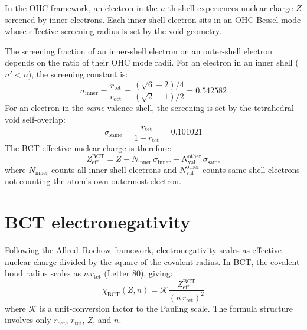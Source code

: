 \documentclass[aps,prl,twocolumn,superscriptaddress,floatfix]{revtex4-2}
\begin{document}
In the OHC framework, an electron in the $n$-th shell
experiences nuclear charge $Z$ screened by inner electrons.
Each inner-shell electron sits in an OHC Bessel mode whose
effective screening radius is set by the void geometry.

The screening fraction of an inner-shell electron on an
outer-shell electron depends on the ratio of their OHC mode
radii. For an electron in an inner shell ($n' < n$), the
screening constant is:
\begin{equation}
  \sigma_\mathrm{inner} = \frac{r_\mathrm{tet}}{r_\mathrm{oct}}
  = \frac{(\sqrt{6}-2)/4}{(\sqrt{2}-1)/2} = 0.542582
  \label{eq:sigma_inner}
\end{equation}
For an electron in the \emph{same} valence shell,
the screening is set by the tetrahedral void self-overlap:
\begin{equation}
  \sigma_\mathrm{same} = \frac{r_\mathrm{tet}}{1 + r_\mathrm{tet}}
  = 0.101021
  \label{eq:sigma_same}
\end{equation}
The BCT effective nuclear charge is therefore:
\begin{equation}
  Z_\mathrm{eff}^\mathrm{BCT} = Z
    - N_\mathrm{inner}\,\sigma_\mathrm{inner}
    - N_\mathrm{val}^\mathrm{other}\,\sigma_\mathrm{same}
  \label{eq:Zeff}
\end{equation}
where $N_\mathrm{inner}$ counts all inner-shell electrons
and $N_\mathrm{val}^\mathrm{other}$ counts same-shell
electrons not counting the atom's own outermost electron.

\section{BCT electronegativity}

Following the Allred--Rochow framework, electronegativity
scales as effective nuclear charge divided by the square
of the covalent radius. In BCT, the covalent bond radius
scales as $n\,r_\mathrm{tet}$ (Letter 80), giving:
\begin{equation}
  \chi_\mathrm{BCT}(Z,n) = \mathcal{K}
    \frac{Z_\mathrm{eff}^\mathrm{BCT}}{(n\,r_\mathrm{tet})^2}
  \label{eq:chi}
\end{equation}
where $\mathcal{K}$ is a unit-conversion factor to the
Pauling scale. The formula structure involves only
$r_\mathrm{oct}$, $r_\mathrm{tet}$, $Z$, and $n$.
\end{document}
